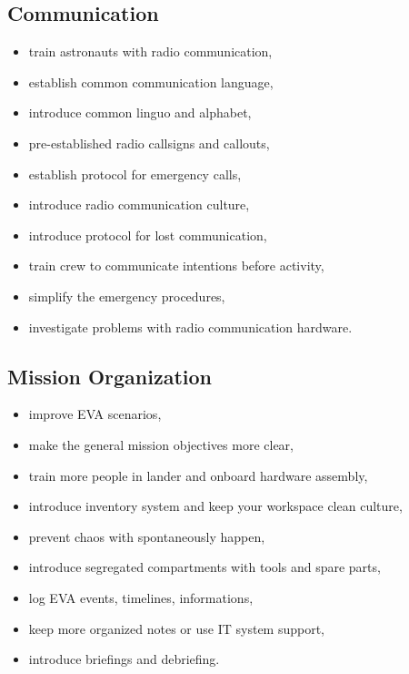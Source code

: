 \documentclass[preprint]{elsarticle}
\begin{document}
\subsection{Communication}
\begin{itemize}
\item train astronauts with radio communication,
\item establish common communication language,
\item introduce common linguo and alphabet,
\item pre-established radio callsigns and callouts,
\item establish protocol for emergency calls,
\item introduce radio communication culture,
\item introduce protocol for lost communication,
\item train crew to communicate intentions before activity,
\item simplify the emergency procedures,
\item investigate problems with radio communication hardware.
\end{itemize}

\subsection{Mission Organization}
\begin{itemize}
\item improve EVA scenarios,
\item make the general mission objectives more clear,
\item train more people in lander and onboard hardware assembly,
\item introduce inventory system and keep your workspace clean culture,
\item prevent chaos with spontaneously happen,
\item introduce segregated compartments with tools and spare parts,
\item log EVA events, timelines, informations,
\item keep more organized notes or use IT system support,
\item introduce briefings and debriefing.
\end{itemize}
\end{document}
